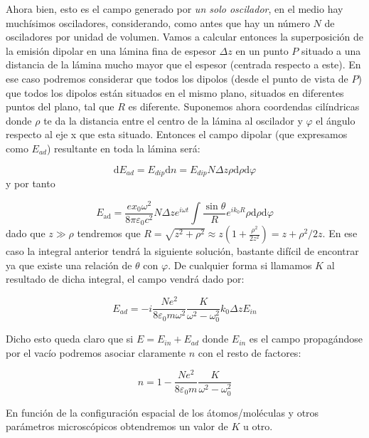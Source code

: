 \documentclass[12pt]{article}
\newcommand{\D}{\mathrm{d}}
\numberwithin{equation}{section}
\numberwithin{figure}{section}
\begin{document}
Ahora bien, esto es el campo generado por \textit{un solo oscilador}, en el medio hay muchísimos osciladores, considerando, como antes que hay un número $N$ de osciladores por unidad de volumen. Vamos a calcular entonces la superposición de la emisión dipolar en una lámina fina de espesor $\Delta z$ en un punto $P$ situado a una distancia de la lámina mucho mayor que el espesor (centrada respecto a este). En ese caso podremos considerar que todos los dipolos (desde el punto de vista de $P$) que todos los dipolos están situados en el mismo plano, situados en diferentes puntos del plano, tal que $R$ es diferente. Suponemos ahora coordendas cilíndricas donde $\rho$ te da la distancia entre el centro de la lámina al oscilador y $\varphi$ el ángulo respecto al eje x que esta situado. Entonces el campo dipolar (que expresamos como $E_{ad}$) resultante en toda la lámina será:


\begin{equation}
\D E_{ad} = E_{dip} \D n = E_{dip} N \Delta z \rho \D \rho \D \varphi
\end{equation}
y por tanto

\begin{equation}
E_{\mathrm{ad}} = \dfrac{e x_0 \omega^2}{8 \pi \varepsilon_0 c^2} N \Delta z e^{i \omega t} \int \dfrac{\sin \theta}{R} e^{i k_0 R} \rho \D \rho \D \varphi
\end{equation} 
dado que $z \gg \rho$ tendremos que $R = \sqrt{z^2 + \rho^2} \approx z(1+\frac{\rho^2}{2z^2}) = z + \rho^2 / 2 z$. En ese caso la integral anterior tendrá la siguiente solución, bastante difícil de encontrar ya que existe una relación de $\theta$ con $\varphi$. De cualquier forma si llamamos $K$ al resultado de dicha integral, el campo vendrá dado por:

\begin{equation}
E_{ad} = - i \dfrac{N e^2}{8 \varepsilon_0 m \omega^2} \dfrac{K}{\omega^2 - \omega_0^2} k_0 \Delta z E_{in}
\end{equation}

Dicho esto queda claro que si $E=E_{in}+E_{ad}$ donde $E_{in}$ es el campo propagándose por el vacío podremos asociar claramente $n$ con el resto de factores:

\begin{equation}
n = 1 -   \dfrac{N e^2}{8 \varepsilon_0 m} \dfrac{K}{\omega^2 - \omega_0^2} \label{Ec:7.5.0.38}
\end{equation}

En función de la configuración espacial de los átomos/moléculas y otros parámetros microscópicos obtendremos un valor de $K$ u otro. 
\end{document}
